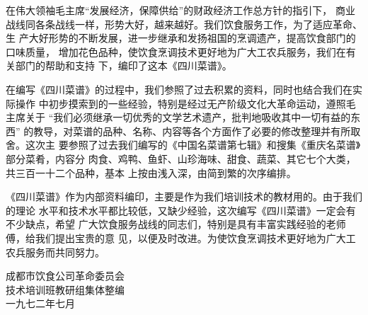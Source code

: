 \begin{center}
\Large\bfseries
{}%
\end{center}

在伟大领袖毛主席{\sffamily“发展经济，保障供给”}的财政经济工作总方针的指引下，
商业战线同各条战线一样，形势大好，越来越好。我们饮食服务工作，为了适应革命、生
产大好形势的不断发展，进一步继承和发扬祖国的烹调遗产，提高饮食部门的口味质量，
增加花色品种，使饮食烹调技术更好地为广大工农兵服务，我们在有关部门的帮助和支持
下，编印了这本《四川菜谱》。

在编写《四川菜谱》的过程中，我们参照了过去积累的资料，同时也结合我们在实际操作
中初步摸索到的一些经验，特别是经过无产阶级文化大革命运动，遵照毛主席关于%
{\sffamily“我们必须继承一切优秀的文学艺术遗产，批判地吸收其中一切有益的东西”}%
的教导，对菜谱的品种、名称、内容等各个方面作了必要的修改整理并有所取舍。这次主
要参照了过去我们编写的《中国名菜谱第七辑》和搜集《重庆名菜谱》部分菜肴，内容分
肉食、鸡鸭、鱼虾、山珍海味、甜食、蔬菜、其它七个大类，共三百一十二个品种，基本
上按由浅入深，由简到繁的次序编排。

《四川菜谱》作为内部资料编印，主要是作为我们培训技术的教材用的。由于我们的理论
水平和技术水平都比较低，又缺少经验，这次编写《四川菜谱》一定会有不少缺点，希望
广大饮食服务战线的同志们，特别是具有丰富实践经验的老师傅，给我们提出宝贵的意
见，以便及时改进。为使饮食烹调技术更好地为广大工农兵服务而共同努力。

\begin{flushright}
成都市饮食公司革命委员会%
	\mbox{\hspace{2em}}\\
技术培训班教研组集体整编%
	\mbox{\hspace{2em}}\\
一九七二年七月%
	\mbox{\hspace{4em}}%
\end{flushright}

